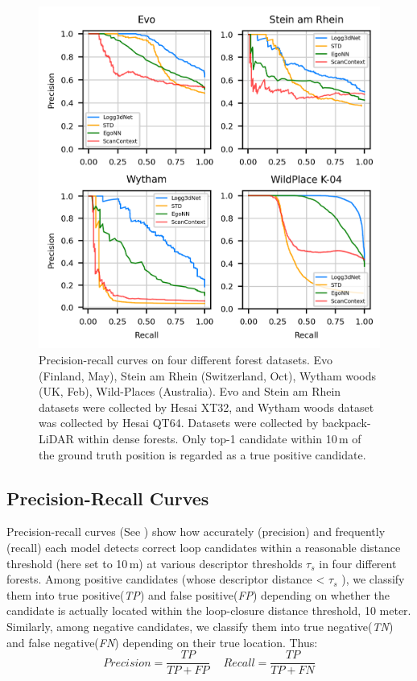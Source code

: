 \begin{figure}[htbp]
  \centering
  \includegraphics[width=0.9\linewidth]{pics/exp_1.1_pr_curves}
  \caption{Precision-recall curves on four different forest datasets. Evo (Finland, May), Stein am Rhein (Switzerland, Oct), Wytham woods (UK, Feb), Wild-Places \cite{knights2023icra} (Australia).
  Evo and Stein am Rhein datasets were collected by Hesai XT32, and Wytham woods dataset was collected by Hesai QT64. Datasets were collected by backpack-LiDAR within dense forests. Only top-1 candidate within 10\,m of the ground truth position is regarded as a true positive candidate.}
  \label{fig:pr_curves}
\end{figure}
\subsection*{Precision-Recall Curves}
Precision-recall curves (See ) show how accurately (precision) and frequently (recall) each  model detects correct loop candidates within a reasonable distance threshold (here set to 10\,m) at various descriptor thresholds $\tau_{s}$ in four different forests. Among positive candidates   (whose descriptor distance < $\tau_{s}$ ), we classify them into true positive(\emph{TP}) and false positive(\emph{FP}) depending on whether the candidate is actually located within the loop-closure distance threshold, 10 meter. 
Similarly, among negative candidates, we classify them into true negative(\emph{TN}) and false negative(\emph{FN}) depending on their true location. Thus:
\[ Precision = \frac{TP}{TP + FP} \quad   \ Recall = \frac{TP}{TP + FN} \]

